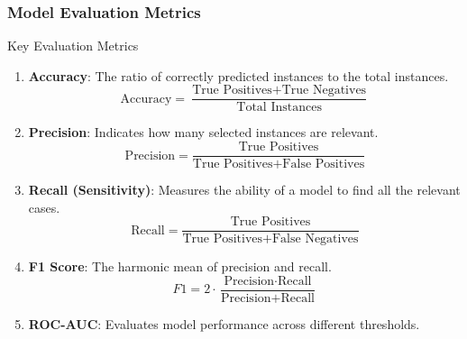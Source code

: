 \documentclass[aspectratio=169]{beamer}
\begin{document}
\begin{frame}[fragile]
    \frametitle{Model Evaluation Metrics}
    \begin{block}{Key Evaluation Metrics}
        \begin{enumerate}
            \item \textbf{Accuracy}: The ratio of correctly predicted instances to the total instances.  
            \begin{equation}
            \text{Accuracy} = \frac{\text{True Positives} + \text{True Negatives}}{\text{Total Instances}}
            \end{equation}

            \item \textbf{Precision}: Indicates how many selected instances are relevant.  
            \begin{equation}
            \text{Precision} = \frac{\text{True Positives}}{\text{True Positives} + \text{False Positives}}
            \end{equation}

            \item \textbf{Recall (Sensitivity)}: Measures the ability of a model to find all the relevant cases.  
            \begin{equation}
            \text{Recall} = \frac{\text{True Positives}}{\text{True Positives} + \text{False Negatives}}
            \end{equation}

            \item \textbf{F1 Score}: The harmonic mean of precision and recall.  
            \begin{equation}
            F1 = 2 \cdot \frac{\text{Precision} \cdot \text{Recall}}{\text{Precision} + \text{Recall}}
            \end{equation}

            \item \textbf{ROC-AUC}: Evaluates model performance across different thresholds.
        \end{enumerate}
    \end{block}
\end{frame}
\end{document}
